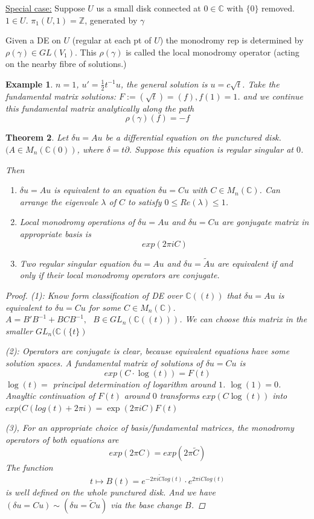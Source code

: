 \documentclass[11pt]{article}
\newtheorem{thm}{Theorem}[section]
\newtheorem{ex}[thm]{Example}
\newcommand{\pd}{\partial}
\newcommand{\cplx}{\mathbb C}
\newcommand{\intg}{\mathbb Z}
\begin{document}
\underline{Special case:} Suppose $U$ us a small disk connected at $0\in \cplx$ with $\{0\}$ removed. $1\in U$. $\pi_1(U,1)=\intg$, generated by $\gamma$

Given a DE on $U$ (regular at each pt of $U$) the monodromy rep is determined by $\rho(\gamma)\in GL(V_1)$. This $\rho(\gamma)$ is called the local monodromy operator (acting on the nearby fibre of solutions.) 

\begin{ex}
$n=1$, $u'=\frac{1}{2}t^{-1}u$, the general solution is 
$u=c\sqrt{t}$. Take the fundamental matrix solutions: $F:=(\sqrt{t})=(f),f(1)=1$. and we continue this fundamental matrix analytically along the path
$$
\rho(\gamma)(f)=-f
$$ 
\end{ex}
\begin{thm}
Let $\delta u=A u$ be a differential equation on the punctured disk. $(A\in M_n(\cplx({0}))$, where $\delta=t \pd$. Suppose this equation is regular singular at $0$. 

Then
\begin{enumerate}[label=(\arabic*)]
\item $\delta u= A u$ is equivalent to an equation $\delta u= C u$ with $C\in M_n(\cplx)$. Can arrange the eigenvale $\lambda $ of $C$ to satisfy $0\leq Re(\lambda)\leq 1$.
\item Local monodromy operations of $\delta u= Au$ and $\delta u=C u$ are gonjugate matrix in appropriate basis is 
$$
exp(2\pi i C)
$$
\item Two regular singular equation $\delta u= A u$ and $\delta u= \tilde{A}u$ are equivalent if and only if their local monodromy operators are conjugate. 
\end{enumerate} 
\begin{proof}
(1): Know form classification of DE
 over $\cplx((t))$ that $\delta u= Au$ is equivalent to $\delta u=C u$ for some $C\in M_n(\cplx)$.
 $A=B'B^{-1}+B C B^{-1},\ \ \ B\in GL_n(\cplx((t)))$. We can choose this matrix in the smaller $GL_n(\cplx(\{t\})$

 (2): Operators are conjugate is clear, because equivalent equations have some solution spaces. A fundamental matrix of solutions of $\delta u= C u$ is 
 $$
exp(C\cdot \log(t))=F(t)
 $$
 $\log(t)=$ principal determination of logarithm around $1$. $\log(1)=0$. Anayltic continuation of $F(t)$ around $0$ transforms
 $exp(C \log(t))$ into $exp(C(log(t)+2\pi i)=\exp(2\pi i C) F(t)$

 (3), For an appropriate choice of basis/fundamental matrices, the monodromy operators of both equations are
 $$
exp(2\pi C)=exp(2\pi \tilde{C})
 $$
 The function
 $$
t\longmapsto B(t)=e^{-2\pi i \tilde{C}log(t)}\cdot e^{2\pi i C log(t)} 
 $$
 is well defined on the whole punctured disk. And we have $(\delta u= C u) \sim (\delta u=\tilde{C} u)$ via the base change $B$.
\end{proof}
\end{thm}
\end{document}
